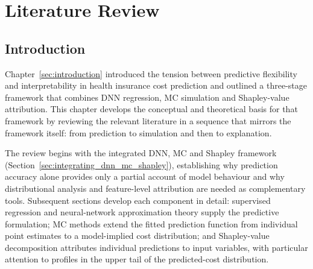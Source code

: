 
\section{Literature Review}
\label{sec:literature_review}


\subsection{Introduction}
\label{sec:chapter2_introduction}

\noindent
Chapter~\ref{sec:introduction} introduced the tension between predictive
flexibility and interpretability in health insurance cost prediction and
outlined a three-stage framework that combines DNN regression,
MC simulation and Shapley-value attribution.  This chapter develops
the conceptual and theoretical basis for that framework by reviewing the
relevant literature in a sequence that mirrors the framework itself: from
prediction to simulation and then to explanation.

\noindent
The review begins with the integrated DNN, MC and Shapley framework
(Section~\ref{sec:integrating_dnn_mc_shapley}), establishing why prediction
accuracy alone provides only a partial account of model behaviour and why
distributional analysis and feature-level attribution are needed as
complementary tools.  Subsequent sections develop each component in detail:
supervised regression and neural-network approximation theory supply the
predictive formulation; MC methods extend the fitted prediction
function from individual point estimates to a model-implied cost distribution;
and Shapley-value decomposition attributes individual predictions to input
variables, with particular attention to profiles in the upper tail of the
predicted-cost distribution.

